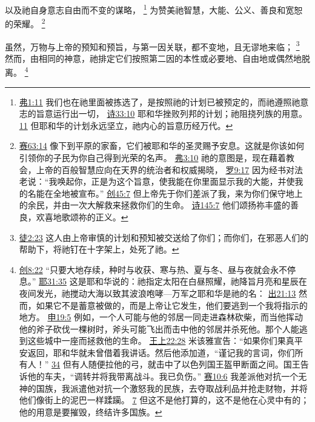 \documentclass[12pt, a4paper, oneside]{ctexart}
\newcounter{parnum}[section]
\newcommand{\N}{%
   \noindent\refstepcounter{parnum}%
    \makebox[\parindent][l]{\textbf{\arabic{parnum}.}}}
\begin{document}
	以及祂自身意志自由而不变的谋略，
	\footnote {
		\href{https://biblehub.com/ephesians/1-11.htm}{弗1:11} 我们也在祂里面被拣选了，是按照祂的计划已被预定的，而祂遵照祂意志的旨意运行出一切，
		\href{https://biblehub.com/psalms/33-10.htm}{诗33:10} 耶和华挫败列邦的计划；祂阻挠列族的用意。
		\href{https://biblehub.com/psalms/33-11.htm}{11} 但耶和华的计划永远坚立，祂内心的旨意历经万代。
	}
	为赞美祂智慧，大能、公义、善良和宽恕的荣耀。
	\footnote {
		\href{https://biblehub.com/isaiah/63-14.htm}{赛63:14} 像下到平原的家畜，它们被耶和华的圣灵赐予安息。这就是你该如何引领你的子民为你自己得到光荣的名声。
		\href{https://biblehub.com/ephesians/3-10.htm}{弗3:10} 祂的意图是，现在藉着教会，上帝的百般智慧应向在天界的统治者和权威揭晓，
		\href{https://biblehub.com/romans/9-17.htm}{罗9:17} 因为经书对法老说：“我唤起你，正是为这个旨意，使我能在你里面显示我的大能，并使我的名能在全地被宣布。”
		\href{https://biblehub.com/genesis/45-7.htm}{创45:7} 但上帝先于你们差派了我，来为你们保守地上的余民，并由一次大解救来拯救你们的生命。
		\href{https://biblehub.com/psalms/145-7.htm}{诗145:7} 他们颂扬祢丰盛的善良，欢喜地歌颂祢的正义。
	}

\N 虽然，万物与上帝的预知和预旨，与第一因关联，都不变地，且无谬地来临；
	\footnote {
		\href{https://biblehub.com/acts/2-23.htm}{徒2:23} 这人由上帝审慎的计划和预知被交送给了你们；而你们，在邪恶人们的帮助下，将祂钉在十字架上，处死了祂。
	}
	然而，由相同的神意，祂排定它们按照第二因的本性或必要地、自由地或偶然地脱离。
	\footnote {
		\href{https://biblehub.com/genesis/8-22.htm}{创8:22} “只要大地存续，种时与收获、寒与热、夏与冬、昼与夜就会永不停息。”
		\href{https://biblehub.com/jeremiah/31-35.htm}{耶31:35} 这是耶和华说的：祂指定太阳在白昼照耀，祂降旨月亮和星辰在夜间发光，祂搅动大海以致其波浪咆哮---万军之耶和华是祂的名：
		\href{https://biblehub.com/exodus/21-13.htm}{出21:13} 然而，如果它不是蓄意被做的，而是上帝让它发生，他们要逃到一个我将指示的地方。
		\href{https://biblehub.com/deuteronomy/19-5.htm}{申19:5} 例如，一个人可能与他的邻居一同走进森林砍柴，而当他挥动他的斧子砍伐一棵树时，斧头可能飞出而击中他的邻居并杀死他。那个人能逃到这些城中一座而拯救他的生命。
		\href{https://biblehub.com/1_kings/22-28.htm}{王上22:28} 米该雅宣告：“如果你们果真平安返回，耶和华就未曾借着我讲话。然后他添加道，“谨记我的言词，你们所有人！”
		\href{https://biblehub.com/1_kings/22-34.htm}{34} 但有人随便拉他的弓，就击中了以色列国王盔甲断面之间。国王告诉他的车夫，“调转并将我带离战斗。我已负伤。”
		\href{https://biblehub.com/isaiah/10-6.htm}{赛10:6} 我差派他对抗一个无神的国族，我派遣他对抗一个激怒我的民族，去夺取战利品并抢走财物，并将他们像街上的泥巴一样蹂躏。
		\href{https://biblehub.com/isaiah/10-7.htm}{7} 但这不是他打算的，这不是他在心灵中有的；他的用意是要摧毁，终结许多国族。
	}
\end{document}
